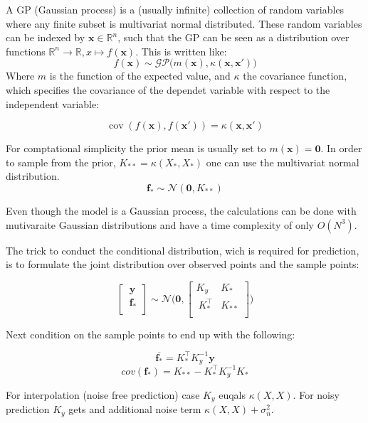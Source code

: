\documentclass[english]{article}
\begin{document}
A GP (Gaussian process) is a (usually infinite) collection of random variables where any finite subset is multivariat normal distributed. These random variables can be indexed by $\mathbf{x} \in \mathbb{R}^n$, such that the GP can be seen as a distribution over functions $\mathbb{R}^n \rightarrow \mathbb{R}, x \mapsto f(\mathbf{x})$. This is written like:
$$f(\mathbf{x}) \sim \mathcal{GP}\big(m(\mathbf{x}), \kappa(\mathbf{x},\mathbf{x}')\big)$$
Where $m$ is the function of the expected value, and $\kappa$ the covariance function, which specifies the covariance of the dependet variable with respect to the independent variable:

$$\operatorname{cov}(f(\mathbf{x}),f(\mathbf{x}')) = \kappa(\mathbf{x},\mathbf{x}')$$

For comptational simplicity the prior mean is usually set to $m(\mathbf{x}) = \mathbf{0}$. In order to sample from the prior, $K_{**} = \kappa(X_*,X_*)$ one can use the multivariat normal distribution.
$$\mathbf{f_*} \sim \mathcal{N}(\mathbf{0}, K_{**})$$

Even though the model is a Gaussian process, the calculations can be done with mutivaraite Gaussian distributions and have a time complexity of only $O(N^3)$.

The trick to conduct the conditional distribution, wich is required for prediction, is to formulate the joint distribution over observed points and the sample points:

$$
\begin{bmatrix}
\ \mathbf{y}\ \\
\ \mathbf{f_*} \\
\end{bmatrix}
\sim \mathcal{N} \Bigg(\mathbf{0},
\begin{bmatrix}
K_y & K_* \\
\ K^{\top}_{*} & K_{**}  \\
\end{bmatrix}
\Bigg)
$$

Next condition on the sample points to end up with the following:

$$\overline{\mathbf{f_*}} = K_*^\top K_y^{-1}\mathbf{y}$$
$$cov(\mathbf{f_*}) = K_{**} - K_*^\top K_y^{-1} K_*$$

For interpolation (noise free prediction) case $K_y$ euqals $\kappa(X,X)$. For noisy prediction $K_y$ gets and additional noise term $\kappa(X,X) + \sigma_n^2$.
\end{document}
